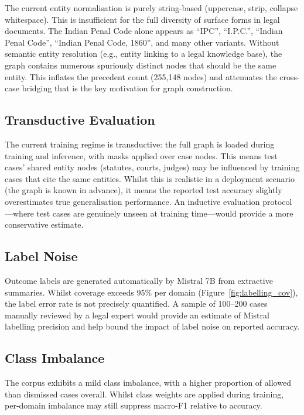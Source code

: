\documentclass[12pt,a4paper]{report}
\begin{document}
The current entity normalisation is purely string-based (uppercase, strip, collapse whitespace). This is insufficient for the full diversity of surface forms in legal documents. The Indian Penal Code alone appears as ``IPC'', ``I.P.C.'', ``Indian Penal Code'', ``Indian Penal Code, 1860'', and many other variants. Without semantic entity resolution (e.g., entity linking to a legal knowledge base), the graph contains numerous spuriously distinct nodes that should be the same entity. This inflates the precedent count (255,148 nodes) and attenuates the cross-case bridging that is the key motivation for graph construction.

\subsection{Transductive Evaluation}

The current training regime is transductive: the full graph is loaded during training and inference, with masks applied over case nodes. This means test cases' shared entity nodes (statutes, courts, judges) may be influenced by training cases that cite the same entities. Whilst this is realistic in a deployment scenario (the graph is known in advance), it means the reported test accuracy slightly overestimates true generalisation performance. An inductive evaluation protocol---where test cases are genuinely unseen at training time---would provide a more conservative estimate.

\subsection{Label Noise}

Outcome labels are generated automatically by Mistral 7B from extractive summaries. Whilst coverage exceeds 95\% per domain (Figure~\ref{fig:labelling_cov}), the label error rate is not precisely quantified. A sample of 100--200 cases manually reviewed by a legal expert would provide an estimate of Mistral labelling precision and help bound the impact of label noise on reported accuracy.

\subsection{Class Imbalance}

The corpus exhibits a mild class imbalance, with a higher proportion of allowed than dismissed cases overall. Whilst class weights are applied during training, per-domain imbalance may still suppress macro-F1 relative to accuracy.
\end{document}
